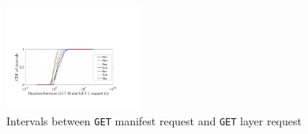 \begin{figure}[t]
	\centering
	\includegraphics[width=0.4\textwidth]{graphs/GML-intervals.pdf}
	\caption{Intervals between \texttt{GET} manifest request and \texttt{GET} layer request}
	\label{fig:intervals}
	
\end{figure}

